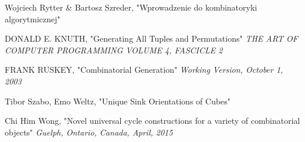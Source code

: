 \documentclass{pracamgr}
\begin{document}
\begin{thebibliography}{99}
   Wojciech Rytter $\&$ Bartosz Szreder,
   "Wprowadzenie do kombinatoryki algorytmicznej"
   
   DONALD E. KNUTH,
   "Generating All Tuples and Permutations"
   \textit{THE ART OF COMPUTER PROGRAMMING VOLUME 4, FASCICLE 2}
  
   FRANK RUSKEY,
   "Combinatorial Generation"
   \textit{Working Version, October 1, 2003}

   Tibor Szabo, Emo Weltz,
   "Unique Sink Orientations of Cubes"
   
   Chi Him Wong,
   "Novel universal cycle constructions for a variety of combinatorial objects"
   \textit{Guelph, Ontario, Canada, April, 2015}
   
\end{thebibliography}
\end{document}
